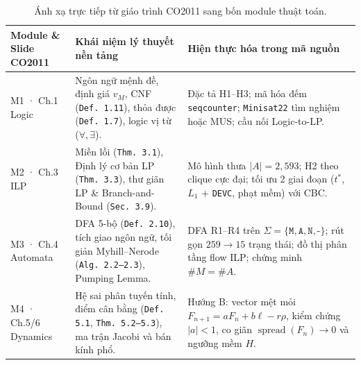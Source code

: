 \begin{table}[htbp]
\centering
\caption{Ánh xạ trực tiếp từ giáo trình CO2011 sang bốn module thuật toán.}
\label{tab:slide_mapping}
\small
\setlength{\tabcolsep}{5pt}
\renewcommand{\arraystretch}{1.22}
\begin{tabularx}{\textwidth}{@{} >{\raggedright\arraybackslash}p{3.2cm} >{\raggedright\arraybackslash}p{5.6cm} L @{}}
\toprule
\textbf{Module \& Slide CO2011} & \textbf{Khái niệm lý thuyết nền tảng} & \textbf{Hiện thực hóa trong mã nguồn} \\
\midrule
M1 · Ch.1 Logic & Ngôn ngữ mệnh đề, định giá $v_M$, CNF (\texttt{Def. 1.11}), thỏa được (\texttt{Def. 1.7}), logic vị từ ($\forall, \exists$). & Đặc tả H1--H3; mã hóa đếm \texttt{seqcounter}; \texttt{Minisat22} tìm nghiệm hoặc MUS; cầu nối Logic-to-LP. \\
M2 · Ch.3 ILP & Miền lồi (\texttt{Thm. 3.1}), Định lý cơ bản LP (\texttt{Thm. 3.3}), thư giãn LP \& Branch-and-Bound (\texttt{Sec. 3.9}). & Mô hình thưa $|A|=2{,}593$; H2 theo clique cực đại; tối ưu 2 giai đoạn ($t^*$, $L_1$ + \texttt{DEVC}, phạt mềm) với CBC. \\
M3 · Ch.4 Automata & DFA 5-bộ (\texttt{Def. 2.10}), tích giao ngôn ngữ, tối giản Myhill--Nerode (\texttt{Alg. 2.2--2.3}), Pumping Lemma. & DFA R1--R4 trên $\Sigma=\{\texttt{M},\texttt{A},\texttt{N},\texttt{-}\}$; rút gọn $259 \to 15$ trạng thái; đồ thị phân tầng flow ILP; chứng minh $\#M=\#A$. \\
M4 · Ch.5/6 Dynamics & Hệ sai phân tuyến tính, điểm cân bằng (\texttt{Def. 5.1}, \texttt{Thm. 5.2--5.3}), ma trận Jacobi và bán kính phổ. & Hướng B: vector mệt mỏi $F_{n+1}=aF_n+b\ell-r\rho$, kiểm chứng $|a|<1$, co giãn $\operatorname{spread}(F_n)\to 0$ và ngưỡng mềm $H$. \\
\bottomrule
\end{tabularx}
\end{table}
\FloatBarrier